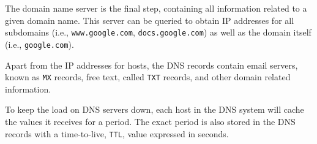 The domain name server is the final step, containing all information related to a given domain name. This server can be queried to obtain IP addresses for all subdomains (i.e., \texttt{www.google.com}, \texttt{docs.google.com}) as well as the domain itself (i.e., \texttt{google.com}).

Apart from the IP addresses for hosts, the DNS records contain email servers, known as \texttt{MX} records, free text, called \texttt{TXT} records, and other domain related information.

To keep the load on DNS servers down, each host in the DNS system will cache the values it receives for a period. The exact period is also stored in the DNS records with a time-to-live, \texttt{TTL}, value expressed in seconds.

